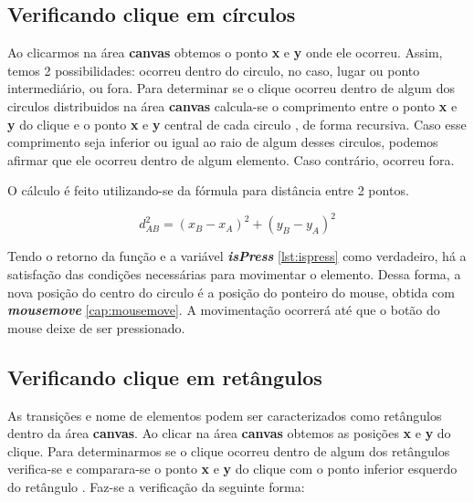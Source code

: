 \documentclass[
	12pt,				%
	openright,			%
	oneside,			%
	a4paper,			%
	english,			%
	brazil				%
	]{abntex2}
\begin{document}
\subsection*{Verificando clique em círculos}

Ao clicarmos na área \textbf{canvas} obtemos o ponto \textbf{x} e \textbf{y} onde ele ocorreu. Assim, temos 2 possibilidades: ocorreu dentro do circulo, no caso, lugar ou ponto intermediário, ou fora. Para determinar se o clique ocorreu dentro de algum dos circulos distribuidos na área \textbf{canvas} calcula-se o comprimento entre o ponto \textbf{x} e \textbf{y} do clique e o ponto \textbf{x} e \textbf{y} central de cada circulo \cite{Macoratti2014}, de forma recursiva. Caso esse comprimento seja inferior ou igual ao raio de algum desses circulos, podemos afirmar que ele ocorreu dentro de algum elemento. Caso contrário, ocorreu fora.

O cálculo é feito utilizando-se da fórmula para distância entre 2 pontos. 

\begin{equation}\label{eq:distancia_entre_pontos}
	d_{AB}^2 = (x_B - x_A)^2 + (y_B - y_A)^2
\end{equation}




Tendo o retorno da função e a variável \textbf{\textit{isPress}} \ref{lst:ispress} como verdadeiro, há a satisfação das condições necessárias para movimentar o elemento. Dessa forma, a nova posição do centro do circulo é a posição do ponteiro do mouse, obtida com \textbf{\textit{mousemove}} \ref{cap:mousemove}. A movimentação ocorrerá até que o botão do mouse deixe de ser pressionado. 

\subsection*{Verificando clique em retângulos}

As transições e nome de elementos podem ser caracterizados como retângulos dentro da área \textbf{canvas}. Ao clicar na área \textbf{canvas} obtemos as posições \textbf{x} e \textbf{y} do clique. Para determinarmos se o clique ocorreu dentro de algum dos retângulos verifica-se e comparara-se o ponto \textbf{x} e \textbf{y} do clique com o ponto inferior esquerdo do retângulo \cite{Manzoni2013}. Faz-se a verificação da seguinte forma:
\end{document}
